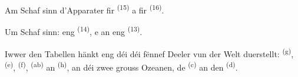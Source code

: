 Am Schaf sinn d'Apparater fir  \textsuperscript{(15)} a fir
 \textsuperscript{(16)}.

Um Schaf sinn: eng  \textsuperscript{(14)}, e  an eng
 \textsuperscript{(13)}.

Iwwer den Tabellen hänkt eng  déi déi fënnef Deeler vun der Welt
duerstellt:  \textsuperscript{(g)}, 
\textsuperscript{(e)},  \textsuperscript{(f)}, 
\textsuperscript{(ab)} an  \textsuperscript{(h)}, an déi zwee grouss
Ozeanen, de  \textsuperscript{(c)} an den 
\textsuperscript{(d)}.
\VUsaut{6.0mm}
\VUfilet{22mm}
